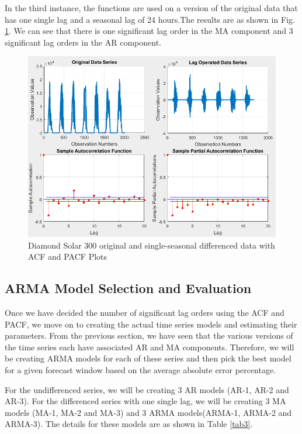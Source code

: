 \documentclass[journal]{IEEEtran}
\begin{document}
In the third instance, the functions are used on a version of the original data that has one single lag and a seasonal lag of 24 hours.The results are as shown in Fig. \ref{fig11}. We can see that there is one significant lag order in the MA component and 3 significant lag orders in the AR component.

\begin{figure}[htpb]
	\centering
	\includegraphics[scale=0.4]{SingleSeasonalLag_5Min_Diamond300.png}
	\caption{Diamond Solar 300 original and single-seasonal differenced data with ACF and PACF Plots}
	\label{fig11} %
\end{figure}

\subsection{ARMA Model Selection and Evaluation}

Once we have decided the number of significant lag orders using the ACF and PACF, we move on to creating the actual time series models and estimating their parameters. From the previous section, we have seen that the various versions of the time series each have associated AR and MA components. Therefore, we will be creating ARMA models for each of these series and then pick the best model for a given forecast window based on the average absolute error percentage.

For the undifferenced series, we will be creating 3 AR models (AR-1, AR-2 and AR-3). For the differenced series with one single lag, we will be creating 3 MA models (MA-1, MA-2 and MA-3) and 3 ARMA models(ARMA-1, ARMA-2 and ARMA-3). The details for these models are as shown in Table \ref{tab3}.
\end{document}
